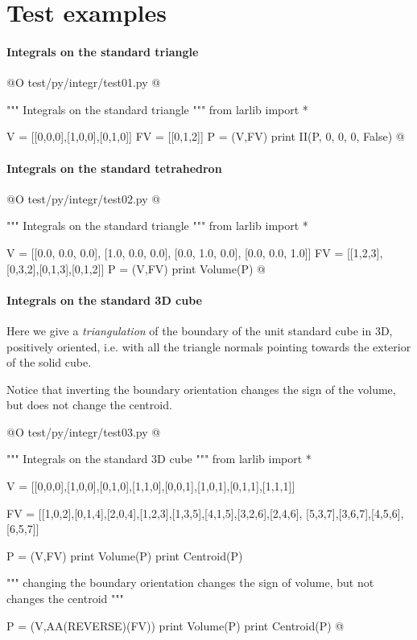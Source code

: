 \documentclass[11pt,oneside]{article}	%
\begin{document}
\section{Test examples}

\paragraph{Integrals on the standard triangle}
@O test/py/integr/test01.py
@{""" Integrals on the standard triangle """
from larlib import *

V = [[0,0,0],[1,0,0],[0,1,0]]
FV = [[0,1,2]]
P = (V,FV)
print II(P, 0, 0, 0, False)
@}


\paragraph{Integrals on the standard tetrahedron}
@O test/py/integr/test02.py
@{""" Integrals on the standard triangle """
from larlib import *

V = [[0.0, 0.0, 0.0], [1.0, 0.0, 0.0], [0.0, 1.0, 0.0], [0.0, 0.0, 1.0]]
FV = [[1,2,3],[0,3,2],[0,1,3],[0,1,2]]
P = (V,FV)
print Volume(P)
@}


\paragraph{Integrals on the standard 3D cube}

Here we give a \emph{triangulation} of the boundary of the unit standard cube in 3D,
positively oriented, i.e. with all the triangle normals pointing towards the
exterior of the solid cube.

Notice that inverting the boundary orientation changes the sign of the volume, 
but does not change the centroid.

@O test/py/integr/test03.py
@{""" Integrals on the standard 3D cube """
from larlib import *

V = [[0,0,0],[1,0,0],[0,1,0],[1,1,0],[0,0,1],[1,0,1],[0,1,1],[1,1,1]]

FV = [[1,0,2],[0,1,4],[2,0,4],[1,2,3],[1,3,5],[4,1,5],[3,2,6],[2,4,6],
	  [5,3,7],[3,6,7],[4,5,6],[6,5,7]]

P = (V,FV)
print Volume(P)
print Centroid(P)

""" changing the boundary orientation changes the sign of volume,
	 but not changes the centroid """

P = (V,AA(REVERSE)(FV))
print Volume(P)
print Centroid(P)
@}
\end{document}

